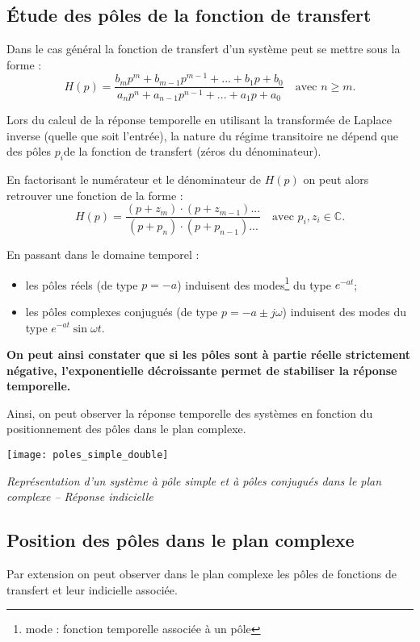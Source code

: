 \subsection{Étude des pôles de la fonction de transfert}
Dans le cas général la fonction de transfert d'un système peut se mettre sous la forme :
$$
H(p)=\dfrac{b_mp^m + b_{m-1}p^{m-1}+...+b_1p+b_0}{a_np^n + a_{n-1}p^{n-1}+...+a_1p+a_0} \quad \text{avec } n\geq m.
$$

Lors du calcul de la réponse temporelle en utilisant la transformée de Laplace inverse (quelle que soit l'entrée), la nature du régime transitoire ne dépend que des pôles $p_i$de la fonction de transfert (zéros du dénominateur).

En factorisant le numérateur et le dénominateur de $H(p)$ on peut alors retrouver une fonction de la forme  :
$$
H(p)=\dfrac{\left(p+ z_m\right)\cdot \left(p+ z_{m-1}\right)...}{\left(p+ p_n\right)\cdot \left(p+ p_{n-1}\right)...} \quad \text{avec } p_i,z_i\in \mathbb{C}.
$$

En passant dans le domaine temporel : 
\begin{itemize}
\item les pôles réels (de type $p=-a$) induisent des modes\footnote{mode : fonction temporelle associée à un pôle} du type $e^{-at}$;
\item les pôles complexes conjugués (de type $p=-a\pm j\omega$) induisent des modes du type 
$e^{-at} \sin \omega t$.
\end{itemize}

\textbf{On peut ainsi constater que si les pôles sont à partie réelle strictement négative, l'exponentielle décroissante permet de stabiliser la réponse temporelle.}

Ainsi, on peut observer la réponse temporelle des systèmes en fonction du positionnement des pôles dans le plan complexe. 

\begin{center}
\texttt{[image: poles\_simple\_double]}

\textit{Représentation d'un système à pôle simple et à pôles conjugués dans le plan complexe -- Réponse indicielle}
\end{center}

\subsection{Position des pôles dans le plan complexe}
Par extension on peut observer dans le plan complexe les pôles de fonctions de transfert et leur indicielle associée.

